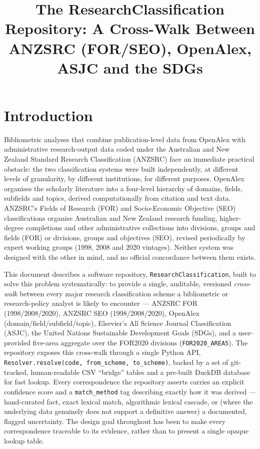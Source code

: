 \documentclass[11pt]{article}
\title{The ResearchClassification Repository: A Cross-Walk Between\\
ANZSRC (FOR/SEO), OpenAlex, ASJC and the SDGs}
\author{}
\date{}
\begin{document}
\maketitle


\section{Introduction}

Bibliometric analyses that combine publication-level data from OpenAlex with
administrative research-output data coded under the Australian and New Zealand Standard
Research Classification (ANZSRC) face an immediate practical obstacle: the two
classification systems were built independently, at different levels of granularity, by
different institutions, for different purposes. OpenAlex organises the scholarly
literature into a four-level hierarchy of domains, fields, subfields and topics, derived
computationally from citation and text data. ANZSRC's Fields of Research (FOR) and
Socio-Economic Objective (SEO) classifications organise Australian and New Zealand
research funding, higher-degree completions and other administrative collections into
divisions, groups and fields (FOR) or divisions, groups and objectives (SEO), revised
periodically by expert working groups (1998, 2008 and 2020 vintages). Neither system was
designed with the other in mind, and no official concordance between them exists.

This document describes a software repository, \texttt{ResearchClassification}, built to
solve this problem systematically: to provide a single, auditable, versioned \emph{cross-walk}
between every major research classification scheme a bibliometric or research-policy
analyst is likely to encounter --- ANZSRC FOR (1998/2008/2020), ANZSRC SEO
(1998/2008/2020), OpenAlex (domain/field/subfield/topic), Elsevier's All Science Journal
Classification (ASJC), the United Nations Sustainable Development Goals (SDGs), and a
user-provided five-area aggregate over the FOR2020 divisions (\texttt{FOR2020\_AREA5}).
The repository exposes this
cross-walk through a single Python API, \texttt{Resolver.resolve(code, from\_scheme,
to\_scheme)}, backed by a set of git-tracked, human-readable CSV ``bridge'' tables and a
pre-built DuckDB database for fast lookup. Every correspondence the repository asserts
carries an explicit confidence score and a \texttt{match\_method} tag describing exactly
how it was derived --- hand-curated fact, exact lexical match, algorithmic lexical
cascade, or (where the underlying data genuinely does not support a definitive answer) a
documented, flagged uncertainty. The design goal throughout has been to make every
correspondence traceable to its evidence, rather than to present a single opaque lookup
table.
\end{document}
